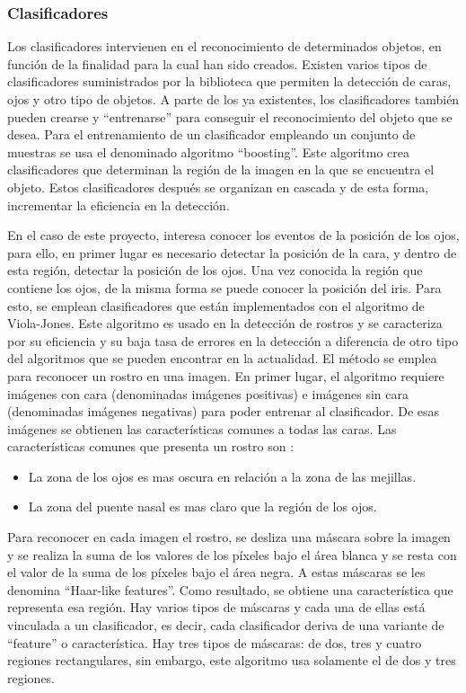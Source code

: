 \subsubsection{Clasificadores}\label{s2_2_1_1}

Los clasificadores intervienen en el reconocimiento de determinados objetos, en función de la finalidad para la cual han sido creados. Existen varios tipos de clasificadores suministrados por la biblioteca que permiten la detección de caras, ojos y otro tipo de objetos.
 A parte de los ya existentes, los clasificadores también pueden crearse y ``entrenarse'' para conseguir el reconocimiento del objeto que se desea. Para el entrenamiento de un clasificador empleando un conjunto de muestras se usa el denominado algoritmo ``boosting''. Este algoritmo crea clasificadores que determinan la región de la imagen en la que se encuentra el objeto. Estos clasificadores después se organizan en cascada y de esta forma, incrementar la eficiencia en la detección.

En el caso de este proyecto, interesa conocer los eventos de la posición de los ojos, para ello, en primer lugar es necesario detectar la posición de la cara, y dentro de esta región, detectar la posición de los ojos. Una vez conocida la región que contiene los ojos, de la misma forma se puede conocer la posición del iris. Para esto, se emplean clasificadores que están implementados con el algoritmo de Viola-Jones. Este algoritmo es usado en la detección de rostros y se caracteriza por su eficiencia y su baja tasa de errores en la detección a diferencia de otro tipo del algoritmos que se pueden encontrar en la actualidad. El método se emplea para reconocer un rostro en una imagen. En primer lugar, el algoritmo requiere imágenes con cara (denominadas imágenes positivas) e imágenes sin cara (denominadas imágenes negativas) para poder entrenar al clasificador. De esas imágenes se obtienen las características comunes a todas las caras.
Las características comunes que presenta un rostro son \citep{iglesias2016reconocimiento}:
\begin{itemize}
\item La zona de los ojos es mas oscura en relación a la zona de las mejillas.
\item La zona del puente nasal es mas claro que la región de los ojos. 
\end{itemize}

Para reconocer en cada imagen el rostro, se desliza una máscara sobre la imagen y se realiza la suma de los valores de los píxeles bajo el área blanca y se resta con el valor de la suma de los píxeles bajo el área negra. A estas máscaras se les denomina ``Haar-like features''. Como resultado, se obtiene una característica que representa esa región. Hay varios tipos de máscaras y cada una de ellas está vinculada a un clasificador, es decir, cada clasificador deriva de una variante de ``feature'' o característica. Hay tres tipos de máscaras: de dos, tres y cuatro regiones rectangulares, sin embargo, este algoritmo usa solamente el de dos y tres regiones. 

